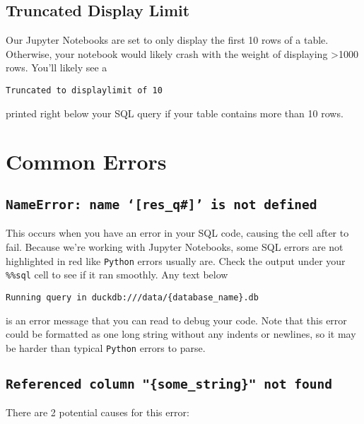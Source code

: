 \documentclass[
  letterpaper,
  DIV=11,
  numbers=noendperiod]{scrreprt}
\begin{document}
\subsection{Truncated Display Limit}\label{truncated-display-limit}

Our Jupyter Notebooks are set to only display the first 10 rows of a
table. Otherwise, your notebook would likely crash with the weight of
displaying \textgreater1000 rows. You'll likely see a

\texttt{Truncated\ to\ displaylimit\ of\ 10}

printed right below your SQL query if your table contains more than 10
rows.

\section{Common Errors}\label{common-errors}

\subsection{\texorpdfstring{\texttt{NameError:\ name\ ‘{[}res\_q\#{]}’\ is\ not\ defined}}{NameError: name `{[}res\_q\#{]}' is not defined}}\label{nameerror-name-res_q-is-not-defined}

This occurs when you have an error in your SQL code, causing the cell
after to fail. Because we're working with Jupyter Notebooks, some SQL
errors are not highlighted in red like \texttt{Python} errors usually
are. Check the output under your \texttt{\%\%sql} cell to see if it ran
smoothly. Any text below

\texttt{Running\ query\ in\ \textquotesingle{}duckdb:///data/\{database\_name\}.db}

is an error message that you can read to debug your code. Note that this
error could be formatted as one long string without any indents or
newlines, so it may be harder than typical \texttt{Python} errors to
parse.

\subsection{\texorpdfstring{\texttt{Referenced\ column\ "\{some\_string\}"\ not\ found}}{Referenced column "\{some\_string\}" not found}}\label{referenced-column-some_string-not-found}

There are 2 potential causes for this error:
\end{document}

